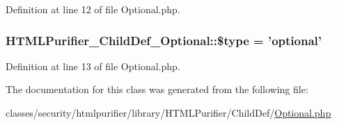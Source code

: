 Definition at line 12 of file Optional.\+php.

\hypertarget{classHTMLPurifier__ChildDef__Optional_ac12756a533fd1f420669156aeb6be162}{
\subsubsection[{\$type}]{\setlength{\rightskip}{0pt plus 5cm}H\+T\+M\+L\+Purifier\+\_\+\+Child\+Def\+\_\+\+Optional\+::\$type = 'optional'}}\label{classHTMLPurifier__ChildDef__Optional_ac12756a533fd1f420669156aeb6be162}


Definition at line 13 of file Optional.\+php.



The documentation for this class was generated from the following file\+:\begin{DoxyCompactItemize}
\item 
classes/security/htmlpurifier/library/\+H\+T\+M\+L\+Purifier/\+Child\+Def/\hyperlink{Optional_8php}{Optional.\+php}\end{DoxyCompactItemize}
